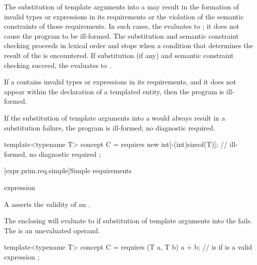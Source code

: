 \pnum
The substitution of template arguments into a 
may result in the formation of invalid types or expressions in its
requirements or the violation of the semantic constraints of those requirements.
In such cases, the  evaluates to ;
it does not cause the program to be ill-formed.
The substitution and semantic constraint checking
proceeds in lexical order and stops when a condition that
determines the result of the  is encountered.
If substitution (if any) and semantic constraint checking succeed,
the  evaluates to .
\begin{note}
If a  contains invalid types or expressions in
its requirements, and it does not appear within the declaration of a templated
entity, then the program is ill-formed.
\end{note}
If the substitution of template arguments into a 
would always result in a substitution failure, the program is ill-formed;
no diagnostic required.
\begin{example}
\begin{codeblock}
template<typename T> concept C =
requires {
  new int[-(int)sizeof(T)]; // ill-formed, no diagnostic required
};
\end{codeblock}
\end{example}

[expr.prim.req.simple]{Simple requirements}
%

\begin{bnf}
\br
    expression \terminal{;}
\end{bnf}

\pnum
A  asserts
the validity of an .
\begin{note}
The enclosing  will evaluate to 
if substitution of template arguments into the  fails.
The  is an unevaluated operand.
\end{note}
\begin{example}
\begin{codeblock}
template<typename T> concept C =
  requires (T a, T b) {
    a + b;  //  is  if  is a valid expression
  };
\end{codeblock}
\end{example}

